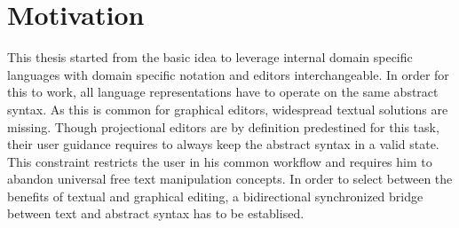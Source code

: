 \section{Motivation}
This thesis started from the basic idea to leverage internal domain specific languages with domain specific notation and editors interchangeable. In order for this to work, all language representations have to operate on the same abstract syntax. As this is common for graphical editors, widespread textual solutions are missing. Though projectional editors are by definition predestined for this task, their user guidance requires to always keep the abstract syntax in a valid state. This constraint restricts the user in his common workflow and requires him to abandon universal free text manipulation concepts. In order to select between the benefits of textual and graphical editing, a bidirectional synchronized bridge between text and abstract syntax has to be establised.  

